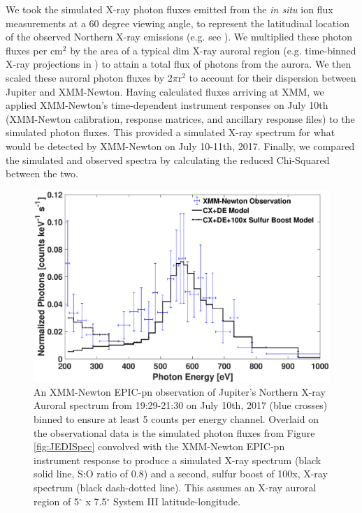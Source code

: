 \documentclass[draft]{agujournal2018}
\begin{document}
We took the simulated X-ray photon fluxes emitted from the \textit{in situ} ion flux measurements at a 60 degree viewing angle, to represent the latitudinal location of the observed Northern X-ray emissions (e.g. see \citet{gladstone2002,dunn2017}).
We multiplied these photon fluxes per cm$^2$ by the area of a typical dim X-ray auroral region (e.g. time-binned X-ray projections in \citet{dunn2016}) to attain a total flux of photons from the aurora.
We then scaled these auroral photon fluxes by 2$\pi$r$^2$ to account for their dispersion between Jupiter and XMM-Newton.
Having calculated fluxes arriving at XMM, we applied XMM-Newton's time-dependent instrument responses on July 10th (XMM-Newton calibration, response matrices, and ancillary response files) to the simulated photon fluxes.
This provided a simulated X-ray spectrum for what would be detected by XMM-Newton on July 10-11th, 2017.
Finally, we compared the simulated and observed spectra by calculating the reduced Chi-Squared between the two.

\begin{figure}[ht]
    \centering
    \includegraphics[width=\textwidth]{Figures/XMMNewtonComparison.eps}
    \caption{An XMM-Newton EPIC-pn observation of Jupiter's Northern X-ray Auroral spectrum from 19:29-21:30 on July 10th, 2017 (blue crosses) binned to ensure at least 5 counts per energy channel. Overlaid on the observational data is the simulated photon fluxes from Figure \ref{fig:JEDISpec} convolved with the XMM-Newton EPIC-pn instrument response to produce a simulated X-ray spectrum (black solid line, S:O ratio of 0.8) and a second, sulfur boost of 100x, X-ray spectrum (black dash-dotted line). This assumes an X-ray auroral region of 5$^{\circ}$ x 7.5$^{\circ}$ System III latitude-longitude.}
    \label{fig:XraySpectrumXMM}
\end{figure}
\end{document}
